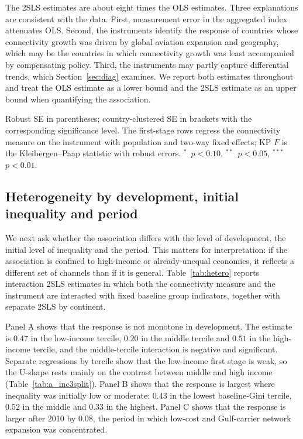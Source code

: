\documentclass[12pt]{article}
\newcommand{\sym}[1]{\ensuremath{^{#1}}}
\begin{document}
The 2SLS estimates are about eight times the OLS estimates. Three explanations are consistent with the data. First, measurement error in the aggregated index attenuates OLS. Second, the instruments identify the response of countries whose connectivity growth was driven by global aviation expansion and geography, which may be the countries in which connectivity growth was least accompanied by compensating policy. Third, the instruments may partly capture differential trends, which Section~\ref{sec:diag} examines. We report both estimates throughout and treat the OLS estimate as a lower bound and the 2SLS estimate as an upper bound when quantifying the association.

\begin{table}[H]\centering\caption{Main results: OLS, first stage, and 2SLS, by connectivity measure.}\label{tab:main}
\begin{threeparttable}\small
\begin{tablenotes}\footnotesize\item Robust SE in parentheses; country-clustered SE in brackets with the corresponding significance level. The first-stage rows regress the connectivity measure on the instrument with population and two-way fixed effects; KP $F$ is the Kleibergen--Paap statistic with robust errors. \sym{*}~$p<0.10$, \sym{**}~$p<0.05$, \sym{***}~$p<0.01$.\end{tablenotes}\end{threeparttable}\end{table}

\subsection{Heterogeneity by development, initial inequality and period}
\label{sec:hetero}
We next ask whether the association differs with the level of development, the initial level of inequality and the period. This matters for interpretation: if the association is confined to high-income or already-unequal economies, it reflects a different set of channels than if it is general. Table~\ref{tab:hetero} reports interaction 2SLS estimates in which both the connectivity measure and the instrument are interacted with fixed baseline group indicators, together with separate 2SLS by continent.

Panel A shows that the response is not monotone in development. The estimate is $0.47$ in the low-income tercile, $0.20$ in the middle tercile and $0.51$ in the high-income tercile, and the middle-tercile interaction is negative and significant. Separate regressions by tercile show that the low-income first stage is weak, so the U-shape rests mainly on the contrast between middle and high income (Table~\ref{tab:a_inc3split}). Panel B shows that the response is largest where inequality was initially low or moderate: $0.43$ in the lowest baseline-Gini tercile, $0.52$ in the middle and $0.33$ in the highest. Panel C shows that the response is larger after 2010 by $0.08$, the period in which low-cost and Gulf-carrier network expansion was concentrated.
\end{document}
